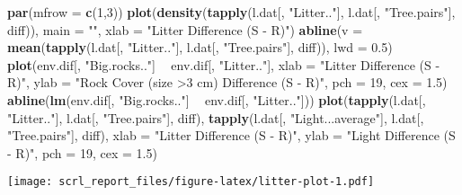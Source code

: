 \documentclass[]{article}
\newenvironment{Shaded}{\begin{snugshade}}{\end{snugshade}}
\newcommand{\KeywordTok}[1]{\textcolor[rgb]{0.13,0.29,0.53}{\textbf{#1}}}
\newcommand{\DataTypeTok}[1]{\textcolor[rgb]{0.13,0.29,0.53}{#1}}
\newcommand{\DecValTok}[1]{\textcolor[rgb]{0.00,0.00,0.81}{#1}}
\newcommand{\FloatTok}[1]{\textcolor[rgb]{0.00,0.00,0.81}{#1}}
\newcommand{\StringTok}[1]{\textcolor[rgb]{0.31,0.60,0.02}{#1}}
\newcommand{\OperatorTok}[1]{\textcolor[rgb]{0.81,0.36,0.00}{\textbf{#1}}}
\newcommand{\NormalTok}[1]{#1}
\begin{document}
\begin{Shaded}
\begin{Highlighting}[]
\KeywordTok{par}\NormalTok{(}\DataTypeTok{mfrow =} \KeywordTok{c}\NormalTok{(}\DecValTok{1}\NormalTok{,}\DecValTok{3}\NormalTok{))}
\KeywordTok{plot}\NormalTok{(}\KeywordTok{density}\NormalTok{(}\KeywordTok{tapply}\NormalTok{(l.dat[, }\StringTok{"Litter.."}\NormalTok{], l.dat[, }\StringTok{"Tree.pairs"}\NormalTok{], diff)), }
    \DataTypeTok{main =} \StringTok{""}\NormalTok{, }\DataTypeTok{xlab =} \StringTok{"Litter Difference (S - R)"}\NormalTok{)}
\KeywordTok{abline}\NormalTok{(}\DataTypeTok{v =} \KeywordTok{mean}\NormalTok{(}\KeywordTok{tapply}\NormalTok{(l.dat[, }\StringTok{"Litter.."}\NormalTok{], l.dat[, }\StringTok{"Tree.pairs"}\NormalTok{], diff)),}
    \DataTypeTok{lwd =} \FloatTok{0.5}\NormalTok{)}
\KeywordTok{plot}\NormalTok{(env.dif[, }\StringTok{"Big.rocks.."}\NormalTok{] }\OperatorTok{~}\StringTok{ }\NormalTok{env.dif[, }\StringTok{"Litter.."}\NormalTok{], }
     \DataTypeTok{xlab =} \StringTok{"Litter Difference (S - R)"}\NormalTok{, }\DataTypeTok{ylab =} \StringTok{"Rock Cover (size >3 cm) Difference (S - R)"}\NormalTok{,}
     \DataTypeTok{pch =} \DecValTok{19}\NormalTok{, }\DataTypeTok{cex =} \FloatTok{1.5}\NormalTok{)}
\KeywordTok{abline}\NormalTok{(}\KeywordTok{lm}\NormalTok{(env.dif[, }\StringTok{"Big.rocks.."}\NormalTok{] }\OperatorTok{~}\StringTok{ }\NormalTok{env.dif[, }\StringTok{"Litter.."}\NormalTok{]))}
\KeywordTok{plot}\NormalTok{(}\KeywordTok{tapply}\NormalTok{(l.dat[, }\StringTok{"Litter.."}\NormalTok{], l.dat[, }\StringTok{"Tree.pairs"}\NormalTok{], diff), }
    \KeywordTok{tapply}\NormalTok{(l.dat[, }\StringTok{"Light...average"}\NormalTok{], l.dat[, }\StringTok{"Tree.pairs"}\NormalTok{], diff), }
    \DataTypeTok{xlab =} \StringTok{"Litter Difference (S - R)"}\NormalTok{, }\DataTypeTok{ylab =} \StringTok{"Light Difference (S - R)"}\NormalTok{,}
    \DataTypeTok{pch =} \DecValTok{19}\NormalTok{, }\DataTypeTok{cex =} \FloatTok{1.5}\NormalTok{)}
\end{Highlighting}
\end{Shaded}

\texttt{[image: scrl\_report\_files/figure-latex/litter-plot-1.pdf]}
\end{document}
